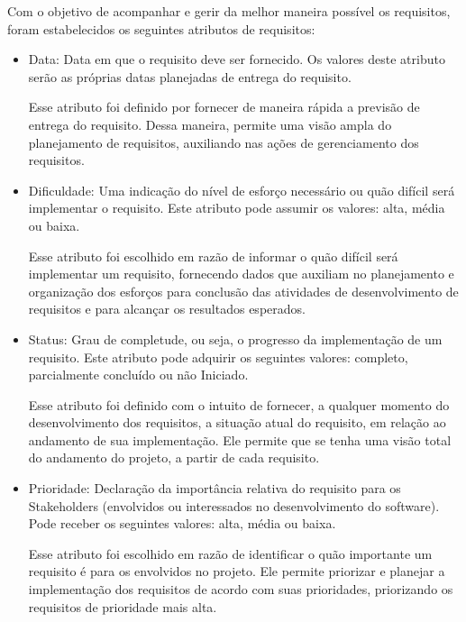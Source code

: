 Com o objetivo de acompanhar e gerir da melhor maneira possível os requisitos, foram estabelecidos os seguintes atributos de requisitos:
\begin{itemize}
\item Data:
Data em que o requisito deve ser fornecido. Os valores deste atributo serão as próprias datas planejadas de entrega do requisito.

Esse atributo foi definido por fornecer de maneira rápida a previsão de entrega do requisito. Dessa maneira, permite uma visão ampla do planejamento de requisitos, auxiliando nas ações de gerenciamento dos requisitos.
\item Dificuldade:
Uma indicação do nível de esforço necessário ou quão difícil será implementar o requisito. Este atributo pode assumir os valores: alta, média ou baixa.

Esse atributo foi escolhido em razão de informar o quão difícil será implementar um requisito, fornecendo dados que auxiliam no planejamento e organização dos esforços para conclusão das atividades de desenvolvimento de requisitos e para alcançar os resultados esperados.

\item Status:
Grau de completude, ou seja, o progresso da implementação de um requisito. Este atributo pode adquirir os seguintes valores: completo, parcialmente concluído ou não Iniciado.

Esse atributo foi definido com o intuito de fornecer, a qualquer momento do desenvolvimento dos requisitos, a situação atual do requisito, em relação ao andamento de sua implementação. Ele permite que se tenha uma visão total do andamento do projeto, a partir de cada requisito.

\item Prioridade:
Declaração da importância relativa do requisito para os Stakeholders (envolvidos ou interessados no desenvolvimento do software). Pode receber os seguintes valores: alta, média ou baixa.

Esse atributo foi escolhido em razão de identificar o quão importante um requisito é para os envolvidos no projeto. Ele permite priorizar e planejar a implementação dos requisitos de acordo com suas prioridades, priorizando os requisitos de prioridade mais alta.


\end{itemize}

